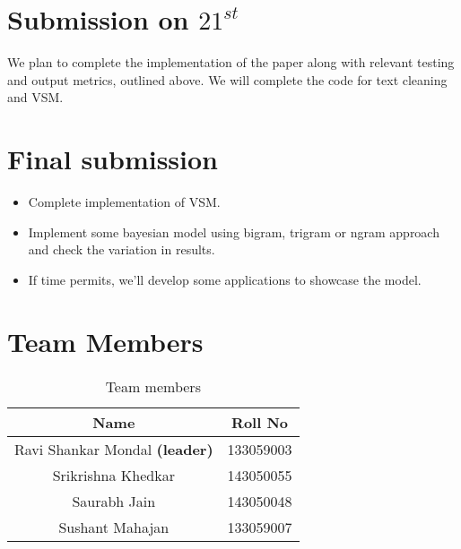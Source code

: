 \section{Submission on $21^{st}$}
We plan to complete the implementation of the paper along with relevant testing and output metrics, outlined above. We will complete the code for text cleaning and VSM.
\section{Final submission}
\begin{itemize}
\item Complete implementation of VSM.
\item Implement some bayesian model using bigram, trigram or ngram approach and check the variation in results.
\item If time permits, we'll develop some applications to showcase the model.
\end{itemize}
\section{Team Members}
\begin{table}[ht!]
\centering
\label{tab-team-members}
\begin{tabular}{c|c}
\textbf{Name} & \textbf{Roll No} \\
\hline
Ravi Shankar Mondal \textbf{(leader)}& 133059003 \\
Srikrishna Khedkar & 143050055 \\
Saurabh Jain & 143050048 \\
Sushant Mahajan & 133059007
\end{tabular}
\caption{Team members}
\end{table}


